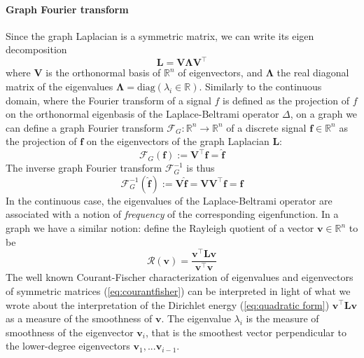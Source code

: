 \paragraph{Graph Fourier transform}
Since the graph Laplacian is a symmetric matrix, we can write its eigen decomposition \cite{Strang}
$$
\mathbf L = \mathbf V\mathbf \Lambda\mathbf V^\intercal
$$
 where $\mathbf V$ is the orthonormal basis of $\mathbb R^n$ of eigenvectors, and $\mathbf \Lambda$ the real diagonal matrix of the eigenvalues $\mathbf \Lambda = \text{diag}(\lambda_i\in \mathbb R)$. Similarly to the continuous domain, where the Fourier transform of a signal $f$ is defined as the projection of $f$ on the orthonormal eigenbasis of the Laplace-Beltrami operator $\Delta$, on a graph we can define a graph Fourier transform $\mathcal F_G: \mathbb R^n\to\mathbb R^n$ of a discrete signal $\mathbf f\in\mathbb R^n$ as the projection of $\mathbf f$ on the eigenvectors of the graph Laplacian $\mathbf L$:
\begin{equation}\label{eq:graph fourier}
\mathcal F_G(\mathbf f) := \mathbf V^\intercal\mathbf f = \hat{\mathbf f}
\end{equation}
The inverse graph Fourier transform $\mathcal F^{-1}_G$ is thus 
\begin{equation}\label{eq:graph fourier inverse}
\mathcal F^{-1}_G(\hat{\mathbf f}) := \mathbf V \hat{\mathbf f} = \mathbf V\mathbf V^\intercal\mathbf f = {\mathbf f}
\end{equation}
In the continuous case, the eigenvalues of the Laplace-Beltrami operator are associated with a notion of \textit{frequency} of the corresponding eigenfunction. In a graph we have a similar notion: define the Rayleigh quotient of a vector $\mathbf v \in \mathbb R^n$ to be
\begin{equation}\label{eq:Rayleigh}
	\mathcal R(\mathbf v) = \frac{\mathbf v^\intercal\mathbf L \mathbf v}{\mathbf v^\intercal\mathbf v}
\end{equation}
The well known \cite{Strang} Courant-Fischer characterization of eigenvalues and eigenvectors of symmetric matrices (\ref{eq:courantfisher}) can be interpreted in light of what we wrote about the interpretation of the Dirichlet energy (\ref{eq:quadratic form}) $\mathbf v^\intercal \mathbf L \mathbf v$ as a measure of the smoothness of $\mathbf v$. The eigenvalue $\lambda_i$ is the measure of smoothness of the eigenvector $\mathbf v_i$, that is the smoothest vector perpendicular to the lower-degree eigenvectors $\mathbf v_1, ... \mathbf v_{i-1}$.

